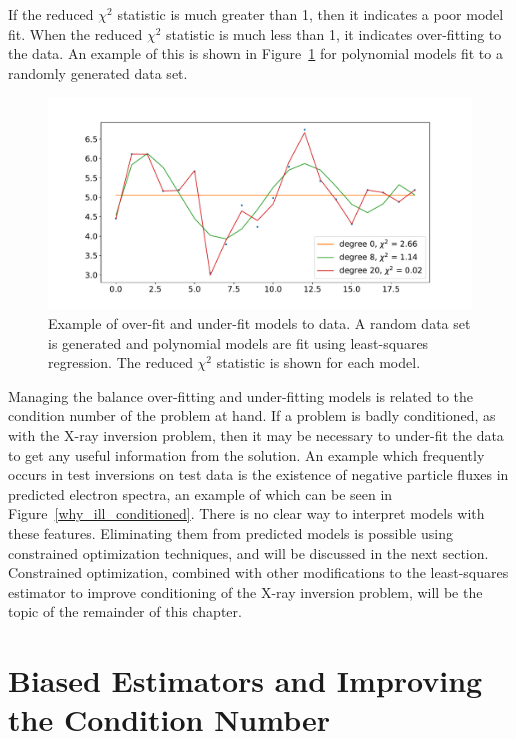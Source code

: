 If the reduced $\chi^2$ statistic is much greater than 1, then it indicates a poor model fit. When the  reduced $\chi^2$ statistic is much less than 1, it indicates over-fitting to the data. An example of this is shown in Figure~\ref{overunderfit_example} for polynomial models fit to a randomly generated data set.

\begin{figure}[p]
    \centering
    \includegraphics[width=1.0\textwidth]{figures/chapter_4/overunderfit_example/fig.pdf}
    \caption{Example of over-fit and under-fit models to data. A random data set is generated and polynomial models are fit using least-squares regression. The reduced $\chi^2$ statistic is shown for each model.}
    \label{overunderfit_example}
\end{figure}

Managing the balance over-fitting and under-fitting models is related to the condition number of the problem at hand. If a problem is badly conditioned, as with the X-ray inversion problem, then it may be necessary to under-fit the data to get any useful information from the solution. An example which frequently occurs in test inversions on test data is the existence of negative particle fluxes in predicted electron spectra, an example of which can be seen in Figure~\ref{why_ill_conditioned}. There is no clear way to interpret models with these features. Eliminating them from predicted models is possible using constrained optimization techniques, and will be discussed in the next section. Constrained optimization, combined with other modifications to the least-squares estimator to improve conditioning of the X-ray inversion problem, will be the topic of the remainder of this chapter. 

\section{Biased Estimators and Improving the Condition Number}

